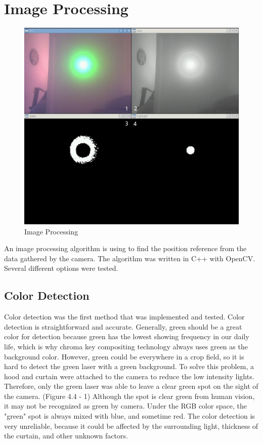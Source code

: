 \section{Image Processing}
\begin{figure}[ht!]
\begin{center}
\includegraphics[scale = 0.7]{pics/imaging.jpg}
\caption{Image Processing}
\end{center}
\end{figure}
An image processing algorithm is using to find the position reference from the data gathered by the camera. The algorithm was written in C++ with OpenCV. Several different options were tested.

\subsection{Color Detection}

Color detection was the first method that was implemented and tested. Color detection is straightforward and accurate. Generally, green should be a great color for detection because green has the lowest showing frequency in our daily life, which is why chroma key compositing technology always uses green as the background color. However, green could be everywhere in a crop field, so it is hard to detect the green laser with a green background. To solve this problem, a hood and curtain were attached to the camera to reduce the low intensity lights. Therefore, only the green laser was able to leave a clear green spot on the sight of the camera. (Figure 4.4 - 1) Although the spot is clear green from human vision, it may not be recognized as green by camera. Under the RGB color space, the "green" spot is always mixed with blue, and sometime red. The color detection is very unreliable, because it could be affected by the surrounding light, thickness of the curtain, and other unknown factors.
